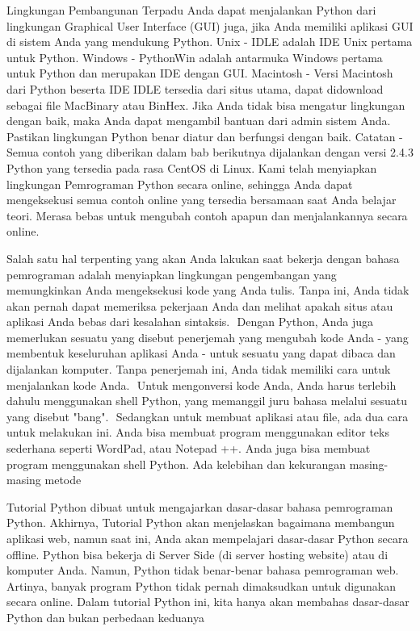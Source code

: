 \documentclass[a4paper,12pt]{report}
\begin{document}
{\fontsize{14pt}{14pt}\selectfont \vspace{\baselineskip}
Lingkungan Pembangunan Terpadu Anda dapat menjalankan Python dari lingkungan Graphical User Interface (GUI) juga, jika Anda memiliki aplikasi GUI di sistem Anda yang mendukung Python. Unix - IDLE adalah IDE Unix pertama untuk Python. Windows - PythonWin adalah antarmuka Windows pertama untuk Python dan merupakan IDE dengan GUI. Macintosh - Versi Macintosh dari Python beserta IDE IDLE tersedia dari situs utama, dapat didownload sebagai file MacBinary atau BinHex. Jika Anda tidak bisa mengatur lingkungan dengan baik, maka Anda dapat mengambil bantuan dari admin sistem Anda. Pastikan lingkungan Python benar diatur dan berfungsi dengan baik. Catatan - Semua contoh yang diberikan dalam bab berikutnya dijalankan dengan versi 2.4.3 Python yang tersedia pada rasa CentOS di Linux. Kami telah menyiapkan lingkungan Pemrograman Python secara online, sehingga Anda dapat mengeksekusi semua contoh online yang tersedia bersamaan saat Anda belajar teori. Merasa bebas untuk mengubah contoh apapun dan menjalankannya secara online. \\} \par
\vspace{14pt}
\noindent 
{\fontsize{14pt}{14pt}\selectfont \vspace{\baselineskip}
Salah satu hal terpenting yang akan Anda lakukan saat bekerja dengan bahasa pemrograman adalah menyiapkan lingkungan pengembangan yang memungkinkan Anda mengeksekusi kode yang Anda tulis. Tanpa ini, Anda tidak akan pernah dapat memeriksa pekerjaan Anda dan melihat apakah situs atau aplikasi Anda bebas dari kesalahan sintaksis.  $  $ Dengan Python, Anda juga memerlukan sesuatu yang disebut penerjemah yang mengubah kode Anda - yang membentuk keseluruhan aplikasi Anda - untuk sesuatu yang dapat dibaca dan dijalankan komputer. Tanpa penerjemah ini, Anda tidak memiliki cara untuk menjalankan kode Anda.  $  $ Untuk mengonversi kode Anda, Anda harus terlebih dahulu menggunakan shell Python, yang memanggil juru bahasa melalui sesuatu yang disebut "bang".  $  $ Sedangkan untuk membuat aplikasi atau file, ada dua cara untuk melakukan ini. Anda bisa membuat program menggunakan editor teks sederhana seperti WordPad, atau Notepad ++. Anda juga bisa membuat program menggunakan shell Python. Ada kelebihan dan kekurangan masing-masing metode \\} \par
\vspace{14pt}
\noindent 
{\fontsize{14pt}{14pt}\selectfont Tutorial Python dibuat untuk mengajarkan dasar-dasar bahasa pemrograman Python. Akhirnya, Tutorial Python akan menjelaskan bagaimana membangun aplikasi web, namun saat ini, Anda akan mempelajari dasar-dasar Python secara offline. Python bisa bekerja di Server Side (di server hosting website) atau di komputer Anda. Namun, Python tidak benar-benar bahasa pemrograman web. Artinya, banyak program Python tidak pernah dimaksudkan untuk digunakan secara online. Dalam tutorial Python ini, kita hanya akan membahas dasar-dasar Python dan bukan perbedaan keduanya \\} \par
\end{document}
